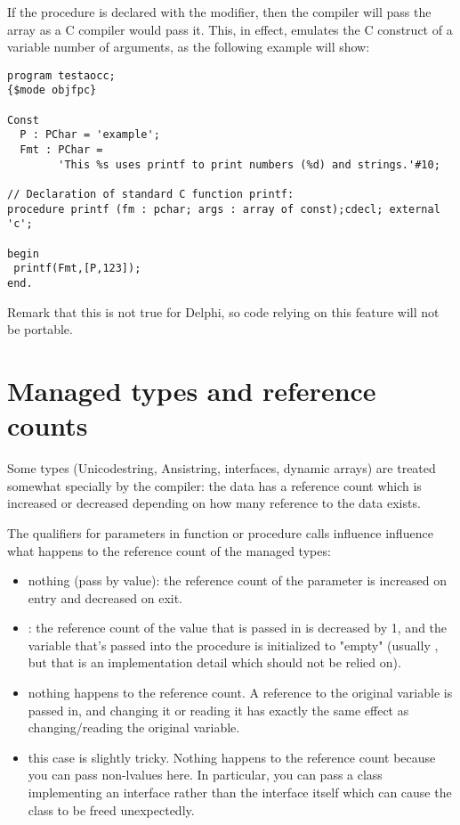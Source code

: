 If the procedure is declared with the  modifier, then the
compiler will pass the array as a C compiler would pass it. This, in effect,
emulates the C construct of a variable number of arguments, as the following
example will show:
\begin{verbatim}
program testaocc;
{$mode objfpc}

Const
  P : PChar = 'example';
  Fmt : PChar =
        'This %s uses printf to print numbers (%d) and strings.'#10;

// Declaration of standard C function printf:
procedure printf (fm : pchar; args : array of const);cdecl; external 'c';

begin
 printf(Fmt,[P,123]);
end.
\end{verbatim}
Remark that this is not true for Delphi, so code relying on this feature
will not be portable.

\section{Managed types and reference counts}
Some types (Unicodestring, Ansistring, interfaces, dynamic arrays) are
treated somewhat specially by the compiler: the data has a reference count
which is increased or decreased depending on how many reference to the data
exists.

The qualifiers for parameters in function or procedure calls influence
influence what happens to the reference count of the managed types:
\begin{itemize}
\item nothing (pass by value): the reference count of the parameter is increased 
on entry and decreased on exit.
\item {}: the reference count of the value that is passed in is decreased by 1,
 and the variable that's passed into the procedure is initialized to "empty"
(usually , but that is an implementation detail which should not
be relied on).
\item {} nothing happens to the reference count. A reference to the original
 variable is passed in, and changing it or reading it has exactly the same effect as changing/reading the original variable.
\item {} this case is slightly tricky. Nothing happens to the reference
count because you can pass non-lvalues here. 
In particular, you can pass a class implementing an interface rather than the interface itself
which can cause the class to be freed unexpectedly.
\end{itemize}

